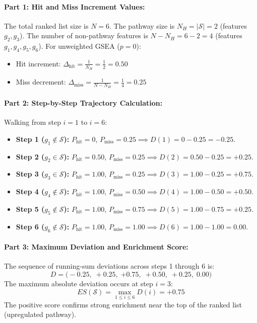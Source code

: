 \documentclass[11pt,twoside,openright]{book}
\begin{document}
\paragraph{Part 1: Hit and Miss Increment Values:}
The total ranked list size is $N = 6$. The pathway size is $N_H = |\mathcal{S}| = 2$ (features $g_2, g_3$).
The number of non-pathway features is $N - N_H = 6 - 2 = 4$ (features $g_1, g_4, g_5, g_6$).
For unweighted GSEA ($p = 0$):
\begin{itemize}
    \item Hit increment: $\Delta_{\text{hit}} = \frac{1}{N_H} = \frac{1}{2} = 0.50$
    \item Miss decrement: $\Delta_{\text{miss}} = \frac{1}{N - N_H} = \frac{1}{4} = 0.25$
\end{itemize}

\paragraph{Part 2: Step-by-Step Trajectory Calculation:}
Walking from step $i = 1$ to $i = 6$:
\begin{itemize}
    \item \textbf{Step 1 ($g_1 \notin \mathcal{S}$):} $P_{\text{hit}} = 0$, $P_{\text{miss}} = 0.25 \implies D(1) = 0 - 0.25 = \mathbf{-0.25}$.
    \item \textbf{Step 2 ($g_2 \in \mathcal{S}$):} $P_{\text{hit}} = 0.50$, $P_{\text{miss}} = 0.25 \implies D(2) = 0.50 - 0.25 = \mathbf{+0.25}$.
    \item \textbf{Step 3 ($g_3 \in \mathcal{S}$):} $P_{\text{hit}} = 1.00$, $P_{\text{miss}} = 0.25 \implies D(3) = 1.00 - 0.25 = \mathbf{+0.75}$.
    \item \textbf{Step 4 ($g_4 \notin \mathcal{S}$):} $P_{\text{hit}} = 1.00$, $P_{\text{miss}} = 0.50 \implies D(4) = 1.00 - 0.50 = \mathbf{+0.50}$.
    \item \textbf{Step 5 ($g_5 \notin \mathcal{S}$):} $P_{\text{hit}} = 1.00$, $P_{\text{miss}} = 0.75 \implies D(5) = 1.00 - 0.75 = \mathbf{+0.25}$.
    \item \textbf{Step 6 ($g_6 \notin \mathcal{S}$):} $P_{\text{hit}} = 1.00$, $P_{\text{miss}} = 1.00 \implies D(6) = 1.00 - 1.00 = \mathbf{0.00}$.
\end{itemize}

\paragraph{Part 3: Maximum Deviation and Enrichment Score:}
The sequence of running-sum deviations across steps 1 through 6 is:
\begin{equation*}
D = \big( -0.25, \; +0.25, \; \mathbf{+0.75}, \; +0.50, \; +0.25, \; 0.00 \big)
\end{equation*}
The maximum absolute deviation occurs at step $i = 3$:
\begin{equation*}
ES(\mathcal{S}) = \max_{1 \le i \le 6} D(i) = \mathbf{+0.75}
\end{equation*}
The positive score confirms strong enrichment near the top of the ranked list (upregulated pathway).
\end{document}
